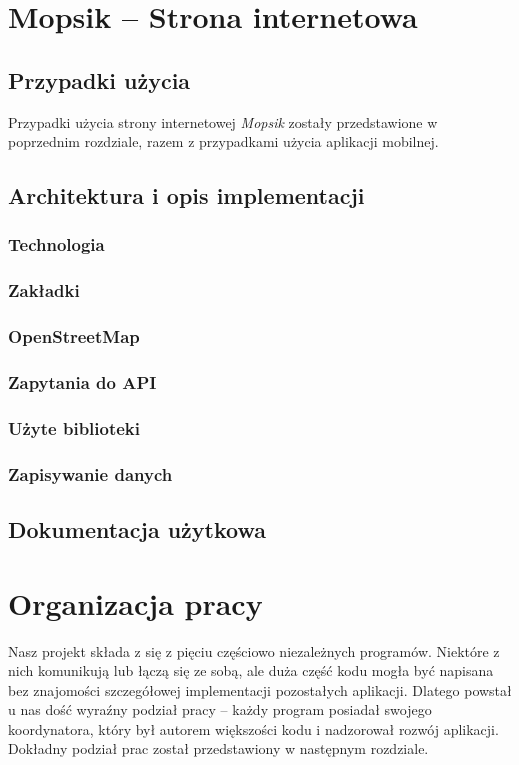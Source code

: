 \chapter{Mopsik -- Strona internetowa}

\section{Przypadki użycia}
Przypadki użycia strony internetowej \textit{Mopsik} zostały przedstawione w poprzednim rozdziale, razem z przypadkami użycia aplikacji mobilnej.

\section{Architektura i opis implementacji}

\subsection{Technologia}
\subsection{Zakładki}
\subsection{OpenStreetMap}
\subsection{Zapytania do API}
\subsection{Użyte biblioteki}
\subsection{Zapisywanie danych}

\section{Dokumentacja użytkowa}

\chapter{Organizacja pracy}
Nasz projekt składa z się z pięciu częściowo niezależnych programów. Niektóre z nich komunikują lub łączą się ze sobą, ale duża część kodu mogła być napisana bez znajomości szczegółowej implementacji pozostałych aplikacji. Dlatego powstał u nas dość wyraźny podział pracy -- każdy program posiadał swojego koordynatora, który był autorem większości kodu i nadzorował rozwój aplikacji. Dokładny podział prac został przedstawiony w następnym rozdziale. 

